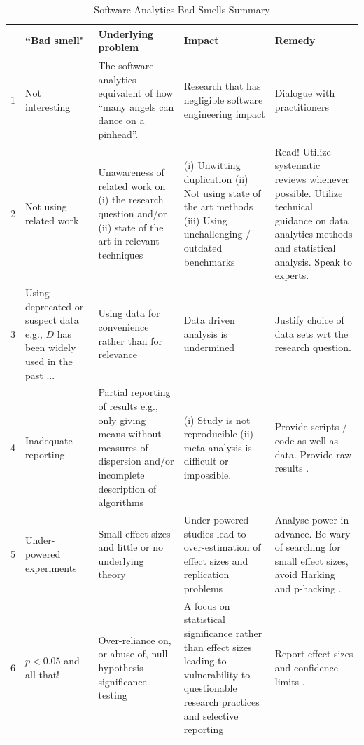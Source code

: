 \documentclass[10pt]{elsarticle}
\begin{document}
\begin{table}
\caption{Software Analytics Bad Smells Summary}
\scriptsize
\begin{center}
\begin{tabular}{|r|p{1.7cm}|p{2.3cm}|p{2.5cm}|p{3cm}|}
\hline
\rowcolor{gray!50}  & \textbf{``Bad smell"} & \textbf{Underlying problem} & \textbf{Impact} & \textbf{Remedy} \\
\hline
1 & Not interesting & The software analytics equivalent of how ``many angels can dance on a pinhead''. & Research that has negligible software engineering impact & Dialogue with practitioners \cite{Bege14,Lo2015,Ivar11} \\
\rowcolor{gray!50}2 & Not using related work & Unawareness of related work on (i) the research question and/or (ii) state of the art in relevant techniques & (i) Unwitting duplication (ii) Not using state of the art methods (iii) Using unchallenging / outdated benchmarks & Read! Utilize systematic reviews whenever possible. Utilize technical guidance on data analytics methods and statistical analysis. Speak to experts. \\
3 & Using deprecated or suspect data e.g., $D$ has been widely used in the past ... & Using data for convenience rather than for relevance & Data driven analysis is undermined \cite{agrawal18} & Justify choice of data sets wrt the research question. \\
\rowcolor{gray!50}4 & Inadequate
\newline reporting & Partial reporting of results e.g., only giving means without measures of dispersion and/or incomplete description of algorithms & (i) Study is not reproducible \cite{Made17} (ii) meta-analysis is difficult or impossible. & Provide scripts / code as well as data. Provide raw results \cite{Good16,Muna17}. \\
5 & Under-powered experiments & Small effect sizes and little or no underlying theory & Under-powered studies lead to over-estimation of effect sizes and replication problems & Analyse power in advance. Be wary of searching for small effect sizes, avoid Harking and p-hacking \cite{Butt13,Jorg16,Muna17}.\\
\rowcolor{gray!50}6 & $p<0.05$ and all that! & Over-reliance on, or abuse of, null hypothesis significance testing & A focus on statistical significance rather than effect sizes leading to vulnerability to questionable research practices and selective reporting \cite{Jorg16} & Report effect sizes and confidence limits \cite{Elli10,Lake14}. \\

\end{tabular}
\end{center}
\end{table}
\end{document}
